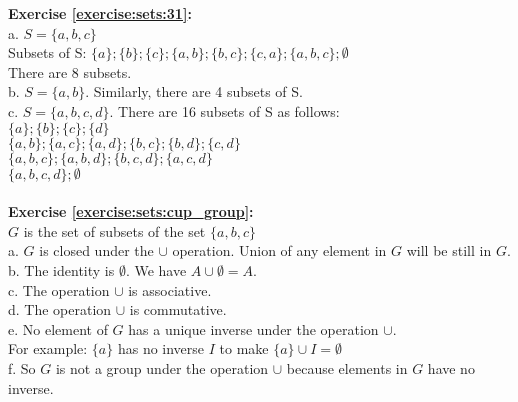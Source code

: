 \textbf{Exercise \ref{exercise:sets:31}:}\\
a. $S=\{a,b,c\}$\\
Subsets of S: $\{a\};\{b\};\{c\};\{a,b\};\{b,c\};\{c,a\};\{a,b,c\};\emptyset$\\
There are 8 subsets.\\
b. $S=\{a,b\}$. Similarly, there are 4 subsets of S.\\
c. $S=\{a,b,c,d\}$. There are 16 subsets of S as follows:\\
$\{a\};\{b\};\{c\};\{d\}$\\
$\{a,b\};\{a,c\};\{a,d\};\{b,c\};\{b,d\};\{c,d\}$\\
$\{a,b,c\};\{a,b,d\};\{b,c,d\};\{a,c,d\}$\\
$\{a,b,c,d\};\emptyset$\\
\\
\textbf{Exercise \ref{exercise:sets:cup_group}:}\\
$G$ is the set of subsets of the set $\{a,b,c\}$\\
a. $G$ is closed under the $\cup$ operation. Union of any element in $G$ will be still in $G$.\\
b. The identity is $\emptyset$. We have $A\cup \emptyset=A$.\\
c. The operation $\cup$ is associative.\\
d. The operation $\cup$ is commutative.\\
e. No element of $G$ has a unique inverse under the operation $\cup$.\\
For example: $\{a\}$ has no inverse $I$ to make $\{a\}\cup I=\emptyset$\\
f. So $G$ is not a group under the operation $\cup$ because elements in $G$ have no inverse.\\